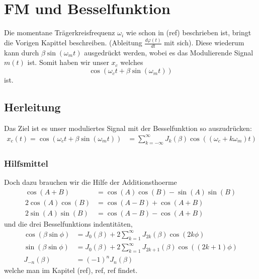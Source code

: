 %
%
%
\section{FM und Besselfunktion 
\label{fm:section:proof}}
Die momentane Trägerkreisfrequenz \(\omega_i\) wie schon in (ref) beschrieben ist, bringt die Vorigen Kapittel beschreiben. (Ableitung \(\frac{d \varphi(t)}{dt}\) mit sich).
Diese wiederum kann durch \(\beta\sin(\omega_mt)\) ausgedrückt werden, wobei es das Modulierende Signal \(m(t)\) ist.
Somit haben wir unser \(x_c\) welches 
\[
\cos(\omega_c t+\beta\sin(\omega_mt))
\]
ist.

\subsection{Herleitung}
Das Ziel ist es unser moduliertes Signal mit der Besselfunktion so auszudrücken:
\begin{align}
    x_c(t)
    = 
    \cos(\omega_ct+\beta\sin(\omega_mt))
    &=
    \sum_{k= -\infty}^\infty J_{k}(\beta) \cos((\omega_c+k\omega_m)t)
    \label{fm:eq:proof}
\end{align}
\subsubsection{Hilfsmittel}
Doch dazu brauchen wir die Hilfe der Additionsthoerme 
\begin{align}
    \cos(A + B) 
    &= 
    \cos(A)\cos(B)-\sin(A)\sin(B)
    \label{fm:eq:addth1}
    \\
    2\cos (A)\cos (B)
    &=
    \cos(A-B)+\cos(A+B)
    \label{fm:eq:addth2}
    \\
    2\sin(A)\sin(B)
    &=
    \cos(A-B)-\cos(A+B)
    \label{fm:eq:addth3}
\end{align}
und die drei Besselfunktions indentitäten,
\begin{align}
    \cos(\beta\sin\phi)
    &=
    J_0(\beta) + 2\sum_{k=1}^\infty J_{2k}(\beta) \cos(2k\phi)
    \label{fm:eq:besselid1}
    \\
    \sin(\beta\sin\phi)
    &=
    J_0(\beta) + 2\sum_{k=1}^\infty J_{2k+1}(\beta) \cos((2k+1)\phi)
    \label{fm:eq:besselid2}
    \\
    J_{-n}(\beta) &= (-1)^n J_n(\beta)
    \label{fm:eq:besselid3}
\end{align}
welche man im Kapitel (ref), ref, ref findet.

